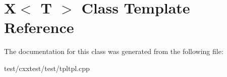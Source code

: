 \hypertarget{classX}{\section{X$<$ T $>$ Class Template Reference}
\label{classX}
}


The documentation for this class was generated from the following file\-:\begin{DoxyCompactItemize}
\item 
test/cxxtest/test/tpltpl.\-cpp\end{DoxyCompactItemize}
